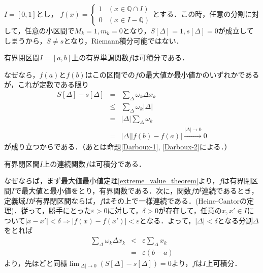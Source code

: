 \documentclass[uplatex, dvipdfmx]{jsreport}
\begin{document}
\begin{screen}
    \begin{example}
        $I=[0,1]$とし，
        $f(x)=\begin{cases}
            1 & (x\in\mathbb{Q}\cap I)\\
            0 & (x\in I-\mathbb{Q})
        \end{cases}$とする．この時，任意の分割に対して，任意の小区間で$M_k=1, m_k=0$となり，$S[\Delta]=1, s[\Delta]=0$が成立してしまうから，$S\neq s$となり，\textrm{Riemann}積分可能ではない．
    \end{example}
    \begin{example}
        有界閉区間$I=[a,b]$上の有界単調関数$f$は可積分である．

        なぜなら，$f(a)$と$f(b)$はこの区間での$f$の最大値か最小値かのいずれかであるが，これが定数である限り
        \begin{eqnarray*}
            S[\Delta]-s[\Delta] &=& \sum_{\Delta}\omega_k \Delta x_k \\ &\le & \sum_\Delta \omega_k |\Delta | \\ &=& |\Delta |\sum_\Delta \omega_k \\
            &=& |\Delta||f(b)-f(a)| \overset{|\Delta|\to 0}{\longrightarrow} 0
        \end{eqnarray*}が成り立つからである．（あとは命題\ref{Darboux-1}, \ref{Darboux-2}による．）
    \end{example}
    \begin{example}
        有界閉区間$I$上の連続関数$f$は可積分である．

        なぜならば，まず最大値最小値定理\ref{extreme_value_theorem}より，$f$は有界閉区間$I$で最大値と最小値をとり，有界関数である．次に，関数$f$が連続であるとき，定義域$I$が有界閉区間ならば，$f$はその上で一様連続である．(\textrm{Heine-Cantor}の定理)．従って，勝手にとった$\varepsilon >0$に対して，$\delta >0$が存在して，任意の$x,x'\in I$について$|x-x'|<\delta\Longrightarrow |f(x)-f(x')|<\varepsilon$となる．よって，$|\Delta |<\delta$となる分割$\Delta$をとれば
        \begin{eqnarray*}
            \sum_\Delta\omega_k \Delta x_k &<& \varepsilon \sum_\Delta x_k \\
            &=& \varepsilon (b-a)
        \end{eqnarray*}
        より，先ほどと同様$\lim_{|\Delta|\to 0}(S[\Delta]-s[\Delta])=0$より，$f$は$I$上可積分．
    \end{example}
\end{screen}
\end{document}
